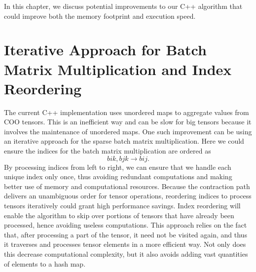 In this chapter, we discuss potential improvements to our C++ algorithm that could
improve both the memory footprint and execution speed.

\section{Iterative Approach for Batch Matrix Multiplication and Index Reordering}
The current C++ implementation uses unordered maps to aggregate values from COO tensors.
This is an inefficient way and can be slow for big tensors because it involves the
maintenance of unordered maps. One such improvement can be using an iterative approach
for the sparse batch matrix multiplication. Here we could ensure the indices for the batch
matrix multiplication are ordered as
\begin{equation*}
    bik, bjk \rightarrow bij.
\end{equation*}
By processing indices from left to right, we can ensure that we handle each unique index
only once, thus avoiding redundant computations and making better use of memory and
computational resources. Because the contraction path delivers an unambiguous order for
tensor operations, reordering indices to process tensors iteratively could grant high
performance savings. Index reordering will enable the algorithm to skip over portions
of tensors that have already been processed, hence avoiding useless computations. This
approach relies on the fact that, after processing a part of the tensor, it need not be visited
again, and thus it traverses and processes tensor elements in a more efficient way. Not
only does this decrease computational complexity, but it also avoids adding vast quantities
of elements to a hash map.

